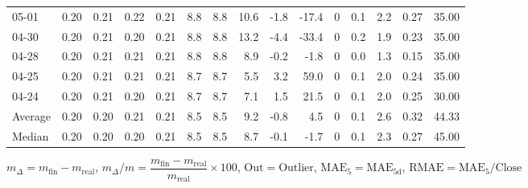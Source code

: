 \begin{threeparttable}
{\begin{tabular}{lrrrrrrrrrrrrrr}
  05-01 &          0.20 &          0.21 &          0.22 &        0.21 &                 8.8 &                8.8 &                10.6 &       -1.8 &        -17.4 &              0 &                 0.1 &              2.2 &            0.27 &                  35.00 \\
  04-30 &          0.20 &          0.21 &          0.20 &        0.21 &                 8.8 &                8.8 &                13.2 &       -4.4 &        -33.4 &              0 &                 0.2 &              1.9 &            0.23 &                  35.00 \\
  04-28 &          0.20 &          0.21 &          0.21 &        0.21 &                 8.8 &                8.8 &                 8.9 &       -0.2 &         -1.8 &              0 &                 0.0 &              1.3 &            0.15 &                  35.00 \\
  04-25 &          0.20 &          0.21 &          0.21 &        0.21 &                 8.7 &                8.7 &                 5.5 &        3.2 &         59.0 &              0 &                 0.1 &              2.0 &            0.24 &                  35.00 \\
  04-24 &          0.20 &          0.21 &          0.20 &        0.21 &                 8.7 &                8.7 &                 7.1 &        1.5 &         21.5 &              0 &                 0.1 &              2.0 &            0.25 &                  30.00 \\
Average &          0.20 &          0.20 &          0.21 &        0.21 &                 8.5 &                8.5 &                 9.2 &       -0.8 &          4.5 &              0 &                 0.1 &              2.6 &            0.32 &                  44.33 \\
 Median &          0.20 &          0.20 &          0.20 &        0.21 &                 8.5 &                8.5 &                 8.7 &       -0.1 &         -1.7 &              0 &                 0.1 &              2.3 &            0.27 &                  45.00 \\
\bottomrule
\end{tabular}
}
\begin{tablenotes}\footnotesize
\item $m_\Delta=m_{\text{fin}}-m_{\text{real}}$,
$m_\Delta/m=\dfrac{m_{\text{fin}}-m_{\text{real}}}{m_{\text{real}}}\times100$,
$\mathrm{Out}=\text{Outlier}$,
$\mathrm{MAE}_5=\mathrm{MAE}_{5\text{d}}$,
$\mathrm{RMAE}=\mathrm{MAE}_5/\text{Close}$
\end{tablenotes}
\end{threeparttable}
\endgroup


